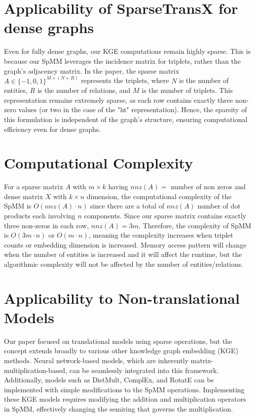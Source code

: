 

\newpage
\appendix
\section{Applicability of SparseTransX for dense graphs} 
\label{A:density}
Even for fully dense graphs, our KGE computations remain highly sparse. This is because our SpMM leverages the incidence matrix for triplets, rather than the graph's adjacency matrix. In the paper, the sparse matrix $A \in \{-1,0,1\}^{M \times (N+R)}$ represents the triplets, where $N$ is the number of entities, $R$ is the number of relations, and $M$ is the number of triplets. This representation remains extremely sparse, as each row contains exactly three non-zero values (or two in the case of the "ht" representation). Hence, the sparsity of this formulation is independent of the graph's structure, ensuring computational efficiency even for dense graphs.

\section{Computational Complexity}
\label{A:complexity}
 For a sparse matrix $A$ with $m \times k$ having $nnz(A)=$ number of non zeros and dense matrix $X$ with $k \times n$ dimension, the computational complexity of the SpMM is $O(nnz(A) \cdot n)$ since there are a total of $nnz(A)$ number of dot products each involving $n$ components. Since our sparse matrix contains exactly three non-zeros in each row, $nnz(A) = 3m$. Therefore, the complexity of SpMM is $O(3m \cdot n)$ or $O(m \cdot n)$, meaning the complexity increases when triplet counts or embedding dimension is increased. Memory access pattern will change when the number of entities is increased and it will affect the runtime, but the algorithmic complexity will not be affected by the number of entities/relations.

\section{Applicability to Non-translational Models}
\label{A:non_trans}
Our paper focused on translational models using sparse operations, but the concept extends broadly to various other knowledge graph embedding (KGE) methods. Neural network-based models, which are inherently matrix-multiplication-based, can be seamlessly integrated into this framework. Additionally, models such as DistMult, ComplEx, and RotatE can be implemented with simple modifications to the SpMM operations. Implementing these KGE models requires modifying the addition and multiplication operators in SpMM, effectively changing the semiring that governs the multiplication.   

